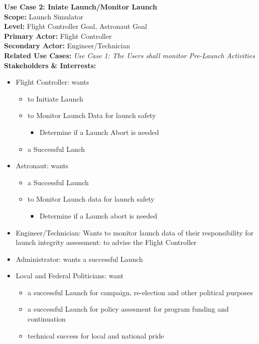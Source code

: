 \documentclass[letterpaper]{article}
\begin{document}
\noindent
\textbf{Use Case 2:  Iniate Launch/Monitor Launch}\\
\textbf{Scope:  }Launch Simulator\\
\textbf{Level:  }Flight Controller Goal, Astronaut Goal\\
\textbf{Primary Actor:  }Flight Controller\\
\textbf{Secondary Actor:  }Engineer/Technician\\
\textbf{Related Use Cases:  }\textit{Use Case 1:  The Users shall
monitor Pre-Launch Activities}\\
\textbf{Stakeholders \& Interrests:  }
\begin{itemize}
\item Flight Controller:  wants
\begin{itemize}
\item to Initiate Launch
\item to  Monitor Launch Data for launch safety
\begin{itemize}
\item Determine if a Launch Abort is needed
\end{itemize}
\item a Successful Lanch
\end{itemize}
\item Astronaut:  wants
\begin{itemize}
\item a Successful Launch
\item to Monitor Launch data for launch safety
\begin{itemize}
\item Determine if a Launch abort is needed
\end{itemize}
\end{itemize}
\item Engineer/Technician:  Wants to monitor launch data of their
responsibility for launch integrity assessment:  to advise the Flight
Controller
\item Administrator:  wants a successful Launch
\item Local and Federal Politicians:  want
\begin{itemize}
\item a successful Launch for
campaign, re-election and other political purposes
\item a successful Launch for policy assesment for program funding and
continuation
\item technical success for local and national pride
\end{itemize}
\end{itemize}
\end{document}
